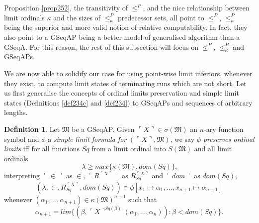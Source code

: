 \documentclass[12pt, twoside]{memoir}
\numberwithin{equation}{section}
\theoremstyle{definition}
\newtheorem{defi}[thm]{Definition}
\theoremstyle{remark}
\theoremstyle{definition}
\theoremstyle{definition}
\theoremstyle{definition}
\theoremstyle{remark}
\begin{document}
Proposition \ref{prop252}, the transitivity of $\leq^P$, and the nice relationship between limit ordinals $\kappa$ and the sizes of $\leq^P_{\kappa}$ predecessor sets, all point to $\leq^P$, $\leq^P_{\kappa}$ being the superior and more valid notion of relative computability. In fact, they also point to a GSeqAP being a better model of generalised algorithm than a GSeqA. For this reason, the rest of this subsection will focus on $\leq^P$, $\leq^P_{\kappa}$ and GSeqAPs.

We are now able to solidify our case for using point-wise limit inferiors, whenever they exist, to compute limit states of terminating runs which are not short. Let us first generalise the concepts of ordinal limits preservation and simple limit states (Definitions \ref{def234c} and \ref{def234}) to GSeqAPs and sequences of arbitrary lengths.

\begin{defi}\label{257c}
Let $\mathfrak{M}$ be a GSeqAP. Given $\ulcorner X \urcorner \in \sigma(\mathfrak{M})$ an $n$-ary function symbol and $\phi$ a \emph{simple limit formula for} $(\ulcorner X \urcorner, \mathfrak{M})$, we say $\phi$ \emph{preserves ordinal limits} iff for all functions $Sq$ from a limit ordinal into $S(\mathfrak{M})$ and all limit ordinals 
\begin{equation*}
    \lambda \geq max\{\kappa(\mathfrak{M}), dom(Sq)\} \text{,}
\end{equation*}
interpreting $\ulcorner \in \urcorner$ as $\in$, $\ulcorner R^{\ulcorner X \urcorner} \urcorner$ as $R_{Sq}^{\ulcorner X \urcorner}$ and $\ulcorner dom \urcorner$ as $dom(Sq)$, 
\begin{equation*}
    (\lambda; \in, R_{Sq}^{\ulcorner X \urcorner}, dom(Sq)) \models \phi[x_1 \mapsto \alpha_1, \dots, x_{n+1} \mapsto \alpha_{n+1}]
\end{equation*}
whenever $(\alpha_1, \dots, \alpha_{n+1}) \in \kappa(\mathfrak{M})^{n+1}$ such that 
\begin{equation*}
    \alpha_{n+1} = lim \{(\beta, \ulcorner X \urcorner^{Sq(\beta)}(\alpha_1, \dots, \alpha_n)) : \beta < dom(Sq)\} \text{.}
\end{equation*}
\end{defi}
\end{document}

